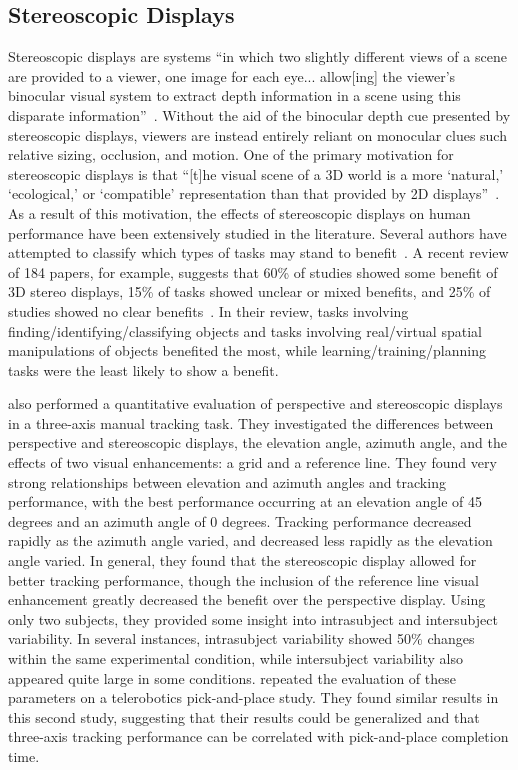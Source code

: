 \subsection{Stereoscopic Displays}
Stereoscopic displays are systems ``in which two slightly different views of a scene are provided to a viewer, one image for each eye... allow[ing] the viewer's binocular visual system to extract depth information in a scene using this disparate information''~\citep{mcintire_stereoscopic_2014}.
Without the aid of the binocular depth cue presented by stereoscopic displays, viewers are instead entirely reliant on monocular clues such relative sizing, occlusion, and motion.
One of the primary motivation for stereoscopic displays is that ``[t]he visual scene of a 3D world is a more `natural,' `ecological,' or `compatible' representation than that provided by 2D displays''~\citep{wickens_three-dimensional_1990}.
As a result of this motivation, the effects of stereoscopic displays on human performance have been extensively studied in the literature.
Several authors have attempted to classify which types of tasks may stand to benefit~\citep{mcintire_stereoscopic_2014, wickens_three-dimensional_1990, wickens_three-dimensional_1989, naikar_perspective_1998, dixon_human_2009}.
A recent review of 184 papers, for example, suggests that 60\% of studies showed some benefit of 3D stereo displays, 15\% of tasks showed unclear or mixed benefits, and 25\% of studies showed no clear benefits~\citep{mcintire_stereoscopic_2014}.
In their review, tasks involving finding/identifying/classifying objects and tasks involving real/virtual spatial manipulations of objects benefited the most, while learning/training/planning tasks were the least likely to show a benefit.

\citeauthor{kim_quantitative_1987} also performed a quantitative evaluation of perspective and stereoscopic displays in a three-axis manual tracking task.
They investigated the differences between perspective and stereoscopic displays, the elevation angle, azimuth angle, and the effects of two visual enhancements: a grid and a reference line.
They found very strong relationships between elevation and azimuth angles and tracking performance, with the best performance occurring at an elevation angle of 45 degrees and an azimuth angle of 0 degrees.
Tracking performance decreased rapidly as the azimuth angle varied, and decreased less rapidly as the elevation angle varied.
In general, they found that the stereoscopic display allowed for better tracking performance, though the inclusion of the reference line visual enhancement greatly decreased the benefit over the perspective display.
Using only two subjects, they provided some insight into intrasubject and intersubject variability.
In several instances, intrasubject variability showed 50\% changes within the same experimental condition, while intersubject variability also appeared quite large in some conditions.
\citeauthor{kim_visual_1987} repeated the evaluation of these parameters on a telerobotics pick-and-place study.
They found similar results in this second study, suggesting that their results could be generalized and that three-axis tracking performance can be correlated with pick-and-place completion time.

